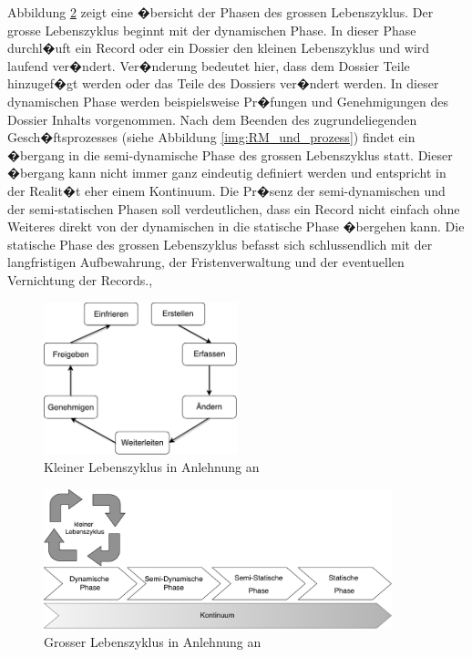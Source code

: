 \documentclass[a4paper,twoside,10pt]{report}
\begin{document}
Abbildung \ref{img:grosser_LZ} zeigt eine �bersicht der Phasen des grossen Lebenszyklus. Der grosse Lebenszyklus beginnt mit der dynamischen Phase. In dieser Phase durchl�uft ein Record oder ein Dossier den kleinen Lebenszyklus und wird laufend ver�ndert. Ver�nderung bedeutet hier, dass dem Dossier Teile hinzugef�gt werden oder das Teile des Dossiers ver�ndert werden. In dieser dynamischen Phase werden beispielsweise Pr�fungen und Genehmigungen des Dossier Inhalts vorgenommen. Nach dem Beenden des zugrundeliegenden Gesch�ftsprozesses (siehe Abbildung \ref{img:RM_und_prozess}) findet ein �bergang in die semi-dynamische Phase des grossen Lebenszyklus statt. Dieser �bergang kann nicht immer ganz eindeutig definiert werden und entspricht in der Realit�t eher einem Kontinuum. Die Pr�senz der semi-dynamischen und der semi-statischen Phasen soll verdeutlichen, dass ein Record nicht einfach ohne Weiteres direkt von der dynamischen in die statische Phase �bergehen kann. Die statische Phase des grossen Lebenszyklus befasst sich schlussendlich mit der langfristigen Aufbewahrung, der Fristenverwaltung und der eventuellen Vernichtung der Records.\cite{rmGest}, \cite{rmHandbook}

\begin{figure}[htb]%
\centering
\includegraphics[width=0.5\textwidth]{kleiner_lebenszyklus.pdf}%
\caption{Kleiner Lebenszyklus in Anlehnung an \cite{rmHandbook}}%
\label{img:kleiner_LZ}%
\end{figure}

\begin{figure}[htb]%
\centering
\includegraphics[width=0.9\textwidth]{grosser_lebenszyklus.pdf}%
\caption{Grosser Lebenszyklus in Anlehnung an \cite{rmHandbook}}%
\label{img:grosser_LZ}%
\end{figure}
\end{document}
